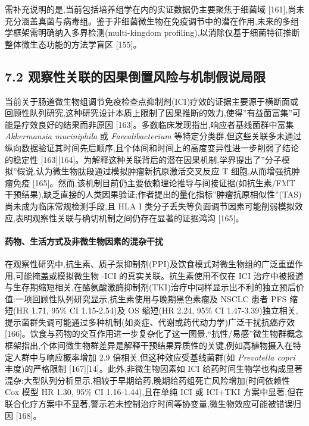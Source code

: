 \documentclass[11pt]{article}
\begin{document}
需补充说明的是,当前包括培养组学在内的实证数据仍主要聚焦于细菌域 {[}161{]},尚未充分涵盖真菌与病毒组。鉴于非细菌微生物在免疫调节中的潜在作用,未来的多组学框架需明确纳入多界检测(multi-kingdom profiling),以消除仅基于细菌特征推断整体微生态功能的方法学盲区 {[}155{]}。

\subsection{7.2 观察性关联的因果倒置风险与机制假说局限}\label{ux89c2ux5bdfux6027ux5173ux8054ux7684ux56e0ux679cux5012ux7f6eux98ceux9669ux4e0eux673aux5236ux5047ux8bf4ux5c40ux9650}

当前关于肠道微生物组调节免疫检查点抑制剂(ICI)疗效的证据主要源于横断面或回顾性队列研究,这种研究设计本质上限制了因果推断的效力,使得''有益菌富集''可能是疗效良好的结果而非原因 {[}163{]}。多数临床发现指出,响应者基线菌群中富集 \emph{Akkermansia muciniphila} 或 \emph{Faecalibacterium} 等特定分类群,但这些关联多未通过纵向数据验证其时间先后顺序,且个体间和时间上的高度变异性进一步削弱了结论的稳定性 {[}163{]}{[}164{]}。为解释这种关联背后的潜在因果机制,学界提出了''分子模拟''假说,认为微生物肽段通过模拟肿瘤新抗原激活交叉反应 T 细胞,从而增强抗肿瘤免疫 {[}165{]}。然而,该机制目前仍主要依赖理论推导与间接证据(如抗生素/FMT 干预结果),缺乏直接的人类因果验证;作者提出的量化指标''肿瘤抗原相似性''(TAS)尚未成为临床常规检测手段,且 HLA I 类分子丢失等负面调节因素可能削弱模拟效应,表明观察性关联与确切机制之间仍存在显著的证据鸿沟 {[}165{]}。

\paragraph{药物、生活方式及非微生物因素的混杂干扰}\label{ux836fux7269ux751fux6d3bux65b9ux5f0fux53caux975eux5faeux751fux7269ux56e0ux7d20ux7684ux6df7ux6742ux5e72ux6270}

在观察性研究中,抗生素、质子泵抑制剂(PPI)及饮食模式对微生物组的广泛重塑作用,可能掩盖或模拟微生物 -ICI 的真实关联。抗生素使用不仅在 ICI 治疗中被报道与生存期缩短相关,在酪氨酸激酶抑制剂(TKI)治疗中同样显示出不利的独立预后价值:一项回顾性队列研究显示,抗生素使用与晚期黑色素瘤及 NSCLC 患者 PFS 缩短(HR 1.71, 95\% CI 1.15-2.54)及 OS 缩短(HR 2.24, 95\% CI 1.47-3.39)独立相关,提示菌群失调可能通过多种机制(如炎症、代谢或药代动力学)广泛干扰抗癌疗效 {[}166{]}。饮食与药物的交互作用进一步复杂化了这一图景,``抗性/易感''微生物群概念框架指出,个体间微生物群差异是解释干预结果异质性的关键,例如高植物摄入在特定人群中与响应概率增加 2.9 倍相关,但这种效应受基线菌群(如 \emph{Prevotella copri} 丰度)的严格限制 {[}167{]}{[}14{]}。此外,非微生物因素如 ICI 给药时间生物学也构成显著混杂:大型队列分析显示,相较于早期给药,晚期给药组死亡风险增加(时间依赖性 Cox 模型 HR 1.30, 95\% CI 1.16-1.44),且在单纯 ICI 或 ICI+TKI 方案中显著,但在联合化疗方案中不显著,警示若未控制治疗时间等协变量,微生物效应可能被错误归因 {[}168{]}。
\end{document}
